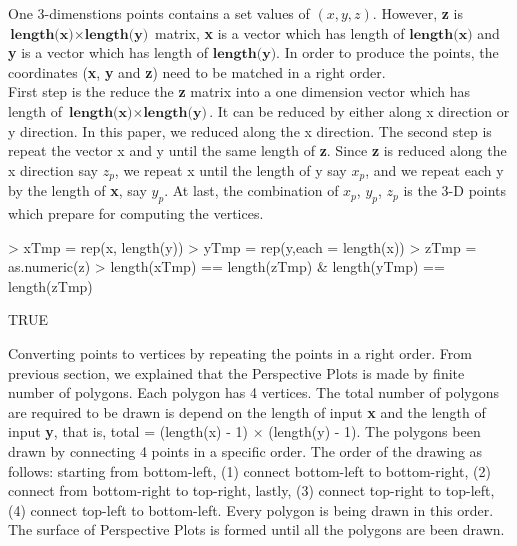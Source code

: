 \documentclass[paper=a4, fontsize=11pt]{report}
\begin{document}
One 3-dimenstions points contains a set values of $(x, y, z)$. However, \textbf{z} is $\textbf{length(x)} \times \textbf{length(y)}$ matrix, \textbf{x} is a vector which has length of $\textbf{length(x)}$ and \textbf{y} is a vector which has length of $\textbf{length(y)}$. In order to produce the points, the coordinates (\textbf{x}, \textbf{y} and \textbf{z}) need to be matched in a right order.\\

First step is the reduce the \textbf{z} matrix into a one dimension vector which has length of $\textbf{length(x)} \times \textbf{length(y)}$. It can be reduced by either along x direction or y direction. In this paper, we reduced along the x direction. The second step is repeat the vector x and y until the same length of \textbf{z}. Since \textbf{z} is reduced along the x direction say $z_p$, we repeat x until the length of y say $x_p$, and we repeat each y by the length of \textbf{x}, say $y_p$. At last, the combination of $x_p$, $y_p$, $z_p$ is the 3-D points which prepare for computing the vertices. \\
\begin{Schunk}
\begin{Sinput}
> xTmp = rep(x, length(y))
> yTmp = rep(y,each = length(x))
> zTmp = as.numeric(z)
> length(xTmp) == length(zTmp) & length(yTmp) == length(zTmp)
\end{Sinput}
\begin{Soutput}
[1] TRUE
\end{Soutput}
\end{Schunk}

Converting points to vertices by repeating the points in a right order. From previous section, we explained that the Perspective Plots is made by finite number of polygons. Each polygon has 4 vertices. The total number of polygons are required to be drawn is depend on the length of input \textbf{x} and the length of input \textbf{y}, that is, total = (length(x) - 1) $\times$ (length(y) - 1). The polygons been drawn by connecting 4 points in a specific order. The order of the drawing as follows: starting from bottom-left, (1) connect bottom-left to bottom-right, (2) connect from bottom-right to top-right, lastly, (3) connect top-right to top-left, (4) connect top-left to bottom-left. Every polygon is being drawn in this order. The surface of Perspective Plots is formed until all the polygons are been drawn. \\
\end{document}
